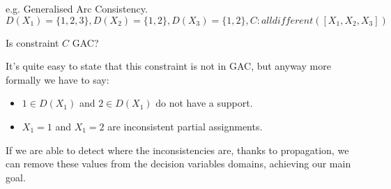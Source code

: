\begin{example}
    e.g. Generalised Arc Consistency. 
    $$ D(X_1) = \{1, 2, 3\}, D(X_2) = \{1, 2\}, D(X_3) = \{1, 2\}, C:\textit{alldifferent}([X_1, X_2, X_3]) $$

    Is constraint $C$ GAC? \vspace{7pt}

    It's quite easy to state that this constraint is not in GAC, but anyway more formally we have to say:
    \begin{itemize}
        \renewcommand{\labelitemi}{-}
        \item $1 \in D(X_1)$ and $2 \in D(X_1)$ do not have a support.
        \item $X_1 = 1$ and $X_1 = 2$ are inconsistent partial assignments.
    \end{itemize} 
\end{example}
If we are able to detect where the inconsistencies are, thanks to propagation, we can remove these values from the decision variables domains, achieving our 
main goal. 